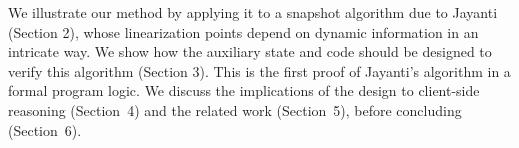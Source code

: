 We illustrate our method by applying it to a snapshot algorithm due to
Jayanti~\cite{Jayanti:STOC05} (Section 2), whose linearization points
depend on dynamic information in an intricate way. We show how the
auxiliary state and code should be designed to verify this algorithm
(Section 3).
%
This is the first proof of Jayanti's algorithm in a formal program
logic. 
%
%
%
%
We discuss the implications of the design to client-side reasoning
(Section~4) and the related work (Section~5), before concluding
(Section~6).
%
%




